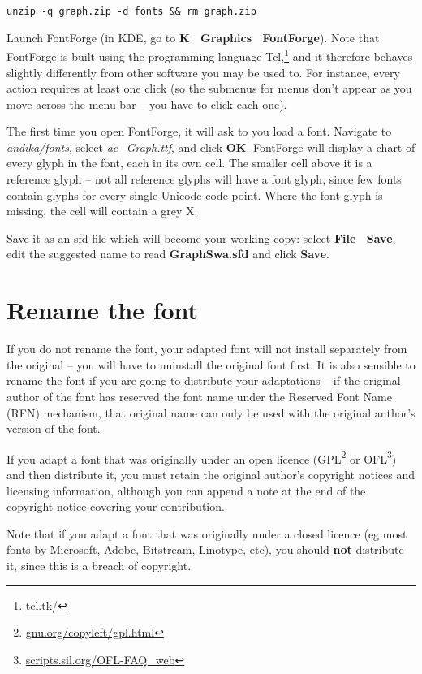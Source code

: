 \verb|unzip -q graph.zip -d fonts && rm graph.zip|

Launch FontForge (in KDE, go to \textbf{K \textrightarrow\ Graphics \textrightarrow\ FontForge}).  Note that FontForge is built using the programming language Tcl,\footnote{\url{tcl.tk/}} and it therefore behaves slightly differently from other software you may be used to.  For instance, every action requires at least one click (so the submenus for menus don't appear as you move across the menu bar -- you have to click each one).

The first time you open FontForge, it will ask to you load a font.  Navigate to \textit{andika/fonts}, select \textit{ae\_Graph.ttf}, and click \textbf{OK}.  FontForge will display a chart of every glyph in the font, each in its own cell.  The smaller cell above it is a reference glyph -- not all reference glyphs will have a font glyph, since few fonts contain glyphs for every single Unicode code point.  Where the font glyph is missing, the cell will contain a grey X.

Save it as an sfd file which will become your working copy: select \textbf{File \textrightarrow\ Save}, edit the suggested name to read \textbf{GraphSwa.sfd} and click \textbf{Save}.

\section{Rename the font}

If you do not rename the font, your adapted font will not install separately from the original -- you will have to uninstall the original font first.  It is also sensible to rename the font if you are going to distribute your adaptations -- if the original author of the font has reserved the font name under the Reserved Font Name (RFN) mechanism, that original name can only be used with the original author's version of the font.

If you adapt a font that was originally under an open licence (GPL\footnote{\url{gnu.org/copyleft/gpl.html}} or OFL\footnote{\url{scripts.sil.org/OFL-FAQ_web}}) and then distribute it, you must retain the original author's copyright notices and licensing information, although you can append a note at the end of the copyright notice covering your contribution.

Note that if you adapt a font that was originally under a closed licence (eg most fonts by Microsoft, Adobe, Bitstream, Linotype, etc), you should \textbf{not} distribute it, since this is a breach of copyright.

